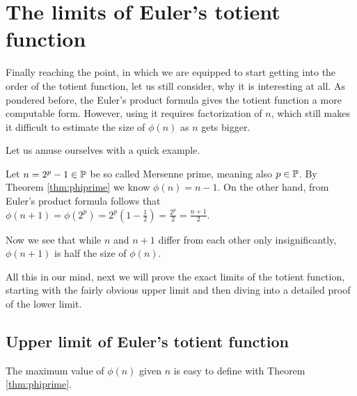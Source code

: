 \documentclass{article}
\begin{document}
\section{The limits of Euler's totient function}

Finally reaching the point, in which we are equipped to start getting into the order of the totient function, let us still consider, why it is interesting at all. As pondered before, the Euler's product formula gives the totient function a more computable form. However, using it requires factorization of $n$, which still makes it difficult to estimate the size of $\phi(n)$ as $n$ gets bigger.

Let us amuse ourselves with a quick example.

\begin{example}
\emph{\cite{Pomerance}} Let $n = 2^p - 1 \in \mathbb{P}$ be so called Mersenne prime, meaning also $p \in \mathbb{P}$. By Theorem \ref{thm:phiprime} we know $\phi(n) = n - 1$. On the other hand, from Euler's product formula follows that $\phi(n+1) = \phi(2^p) = 2^p(1-\frac{1}{2}) = \frac{2^p}{2} = \frac{n+1}{2}$.

Now we see that while $n$ and $n+1$ differ from each other only insignificantly, $\phi(n+1)$ is half the size of $\phi(n)$.
\end{example}


All this in our mind, next we will prove the exact limits of the totient function, starting with the fairly obvious upper limit and then diving into a detailed proof of the lower limit.

\subsection{Upper limit of Euler's totient function}

The maximum value of $\phi(n)$ given $n$ is easy to define with Theorem \ref{thm:phiprime}.
\end{document}
